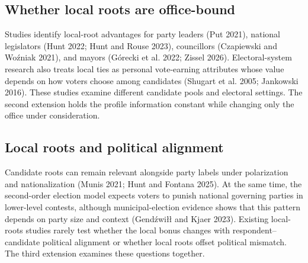 \documentclass[
  letterpaper,
  DIV=11,
  numbers=noendperiod]{scrartcl}
\newcommand{\criticmarkupadd}[1]{#1}
\newcommand{\criticmarkuprm}[1]{}
\begin{document}
\subsection{Whether local roots are
office-bound}\label{whether-local-roots-are-office-bound}

\criticmarkuprm{The relevance of municipal roots may vary with
office.}\criticmarkupadd{Studies identify local-root advantages for
party leaders (Put 2021), national legislators (Hunt 2022; Hunt and
Rouse 2023), councillors (Czapiewski and Woźniak 2021), and mayors
(Górecki et al. 2022; Zissel 2026).} Electoral-system research
\criticmarkupadd{also }treats local ties as personal vote-earning
attributes whose value depends on how voters choose among candidates
(Shugart et al. 2005; Jankowski 2016). \criticmarkuprm{Councillors
represent}\criticmarkupadd{These studies examine different candidate
pools and electoral settings. The second extension holds} the
\criticmarkuprm{smallest territory, mayors hold municipality-wide
executive office, and MPs provide a less municipally focused comparison.
Every municipal-connection statement carries}\criticmarkupadd{profile}
information \criticmarkuprm{in all three
conditions;}\criticmarkupadd{constant while changing only} the
\criticmarkuprm{hypothesis concerns its relative weight. We expect the
place-based bonus to be largest for councillors, smaller for mayors, and
smallest for MPs, and test this ordering with the full interaction, an
omnibus Wald test, and pairwise }office
\criticmarkuprm{contrasts.}\criticmarkupadd{under consideration.}

\subsection{Local roots and political
alignment}\label{local-roots-and-political-alignment}

\criticmarkuprm{Place-based cues coexist with national political
information. }Candidate roots \criticmarkupadd{can }remain relevant
alongside party labels under polarization and nationalization (Munis
2021; Hunt and Fontana 2025)\criticmarkuprm{, while Poland's party
competition follows a durable government--opposition divide (Tworzecki
2019). A profile's attitude toward the current government can therefore
signal ideological or partisan compatibility without naming a party. The
mayoral and councillor prompts test whether this national alignment also
structures candidate choice for subnational office.}\criticmarkupadd{.
At the same time, the second-order election model expects voters to
punish national governing parties in lower-level contests, although
municipal-election evidence shows that this pattern depends on party
size and context (Gendźwiłł and Kjaer 2023). Existing local-roots
studies rarely test whether the local bonus changes with
respondent--candidate political alignment or whether local roots offset
political mismatch. The third extension examines these questions
together.}
\end{document}

